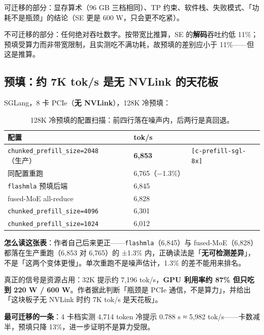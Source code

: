 可迁移的部分：显存算术（96 GB 三档相同）、TP 约束、软件栈、失败模式、「功耗不是瓶颈」的结论（SE 更是 600 W，只会更不吃紧）。


不可迁移的部分：任何绝对吞吐数字。按带宽比推算，SE 的\textbf{解码}吞吐约低 11\%；预填受算力而非带宽限制，且实测吃不满功耗，故预填的差别应小于 11\%——但这是推算。


\subsection{预填：约 7K tok/s 是无 NVLink 的天花板}

SGLang，8 卡 PCIe（\textbf{无 NVLink}），128K 冷预填：


\begin{table}[t]
\centering
\footnotesize
\setlength{\tabcolsep}{4pt}
\caption{128K 冷预填的配置扫描：前四行落在噪声内，后两行是真回退。}
\label{tab:8}
\begin{tabularx}{\textwidth}{Xll}
\toprule
配置 & tok/s &  \\
\midrule
\texttt{chunked\_prefill\_size=2048}（生产） & \textbf{6,853} & {\scriptsize\texttt{[c-\hspace{0pt}prefill-\hspace{0pt}sgl-\hspace{0pt}8x]}} \\
同配置重跑 & 6,765（−1.3\%） &  \\
\texttt{flashmla} 预填后端 & 6,845 &  \\
fused-MoE all-reduce & 6,828 &  \\
\texttt{chunked\_prefill\_size=4096} & 6,301 &  \\
\texttt{chunked\_prefill\_size=1024} & 6,012 &  \\
\bottomrule
\end{tabularx}
\end{table}

\textbf{怎么读这张表}：作者自己后来更正——\texttt{flashmla}（6,845）与 fused-MoE（6,828）都落在生产重跑（6,853 对 6,765）的 ±1.3\% 内，正确读法是「\textbf{无可检测差异}」，不是「这两个变体更慢」。单次重跑不是噪声估计，1.3\% 的差不能用来排名。


真正的信号是资源占用：32K 提示约 7,196 tok/s，\textbf{GPU 利用率约 87\% 但只吃到 220 W / 600 W}。作者据此判断「瓶颈是 PCIe 通信，不是算力」，并给出「这块板子无 NVLink 时约 7K tok/s 是天花板」。


\textbf{最可迁移的一条}：4 卡档实测 4,714 token 冷提示 0.788 s ≈ 5,982 tok/s——卡数减半，预填只降 13\%，进一步证明不是算力受限。


